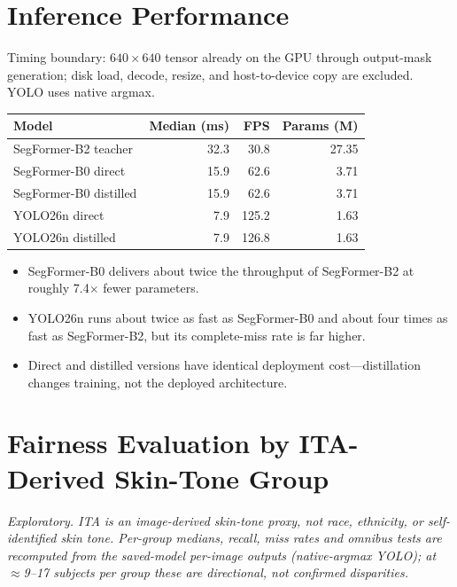 \documentclass[11pt]{article}
\begin{document}
\section{Inference Performance}

Timing boundary: $640\times640$ tensor already on the GPU through output-mask generation;
disk load, decode, resize, and host-to-device copy are excluded. YOLO uses native argmax.

\begin{center}
\begin{tabular}{l R R R}
\toprule
Model & Median (ms) & FPS & Params (M) \\
\midrule
SegFormer-B2 teacher   & 32.3 & 30.8  & 27.35 \\
SegFormer-B0 direct    & 15.9 & 62.6  & 3.71 \\
SegFormer-B0 distilled & 15.9 & 62.6  & 3.71 \\
YOLO26n direct         & 7.9  & 125.2 & 1.63 \\
YOLO26n distilled      & 7.9  & 126.8 & 1.63 \\
\bottomrule
\end{tabular}
\end{center}

\begin{itemize}[leftmargin=1.4em,itemsep=2pt,topsep=2pt]
  \item SegFormer-B0 delivers about twice the throughput of SegFormer-B2 at roughly
        7.4$\times$ fewer parameters.
  \item YOLO26n runs about twice as fast as SegFormer-B0 and about four times as fast as
        SegFormer-B2, but its complete-miss rate is far higher.
  \item Direct and distilled versions have identical deployment cost---distillation
        changes training, not the deployed architecture.
\end{itemize}

\section{Fairness Evaluation by ITA-Derived Skin-Tone Group}

\textit{\small Exploratory. ITA is an image-derived skin-tone proxy, not race, ethnicity,
or self-identified skin tone. Per-group medians, recall, miss rates and omnibus tests are
recomputed from the saved-model per-image outputs (native-argmax YOLO); at $\approx$9--17
subjects per group these are directional, not confirmed disparities.}
\end{document}
